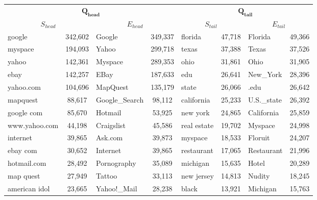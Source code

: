 \documentclass[a0,portrait,final]{a0poster}
\newcommand{\tail}[1]{$\mathbf{Q_{tail}}${}}
\newcommand{\head}[1]{$\mathbf{Q_{head}}${}}
\newcommand{\stail}[1]{$S_{tail}${}}
\newcommand{\shead}[1]{$S_{head}${}}
\newcommand{\etail}[1]{$E_{tail}${}}
\newcommand{\ehead}[1]{$E_{head}${}}
\begin{document}
\begin{multicols}{2}
	\vspace{1cm}
\begin{center}
	{\small
\begin{tabular}{lc|lc|lc|lc}
\toprule
\multicolumn{4}{c}{\head{}} & \multicolumn{4}{c}{\tail{}}\\
\multicolumn{2}{c}{\shead{}} & \multicolumn{2}{c}{\ehead{}} & \multicolumn{2}{c}{\stail{}} & \multicolumn{2}{c}{\etail{}}\\
\midrule
google         & 342,602  &  Google  		   & 349,337  &  florida 	 &	47,718	&	Florida 		& 49,366 \\
myspace        & 194,093  &  Yahoo\!  		   & 299,718  &  texas  	 &	 37,388  &   Texas   		& 37,526 \\
yahoo          & 142,361  &  Myspace 		   & 289,353  &  ohio    	 &	31,861   &   Ohio    		& 31,905 \\			
ebay           & 142,257  &   EBay   		   & 187,633  &  edu     	 &	26,641   &   New\_York        & 28,396 \\
yahoo.com      & 104,696  &  MapQuest          & 135,179  &  state   	 &	26,066   &   .edu    		& 26,642 \\
mapquest       & 88,617   &  Google\_Search     & 98,112   &  california  &   25,233  &   U.S.\_state      & 26,392 \\
google com     & 85,670   &  Hotmail           & 53,925   &  new york    &   24,865  &   California      & 25,859 \\
www.yahoo.com  & 44,198   &  Craigslist        & 45,586   &  real estate &   19,702  &   Myspace 		& 24,998 \\
internet       & 39,865   &  Ask.com           & 39,873   &  myspace 	 &	18,533   &   Floruit 		& 24,207 \\
ebay com       & 30,652   &  Internet          & 39,865   &  restaurant  &  17,065   &   Restaurant      & 21,996 \\
hotmail.com    & 28,492   &  Pornography       & 35,089   &  michigan    &   15,635  &   Hotel   		& 20,289 \\
map quest      & 27,949   &  Tattoo            & 33,113   &  new jersey  &   14,813  &   Nudity  		& 18,245 \\
american idol  & 23,665   &  Yahoo!\_Mail       & 28,238   &  black   	 &	13,921   &   Michigan        & 15,763 \\
\bottomrule
\end{tabular}
}
\end{center}
\vspace{1cm}


\end{multicols}
\end{document}
